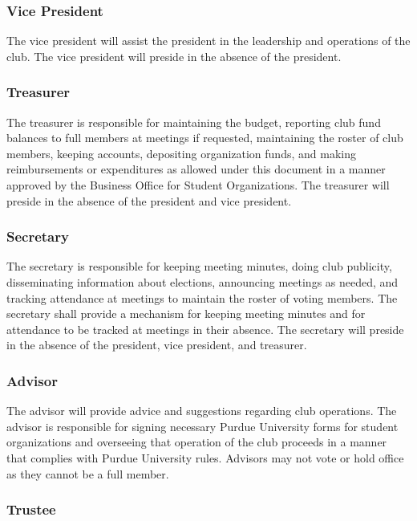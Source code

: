 \documentclass{article}
\begin{document}
\subsubsection{Vice President}

The vice president will assist the president in the leadership and operations of
the club. The vice president will preside in the absence of the president.

\subsubsection{Treasurer}

The treasurer is responsible for maintaining the budget, reporting club fund
balances to full members at meetings if requested, maintaining the roster of
club members, keeping accounts, depositing organization funds, and making
reimbursements or expenditures as allowed under this document in a manner
approved by the Business Office for Student Organizations. The treasurer will
preside in the absence of the president and vice president.

\subsubsection{Secretary}

The secretary is responsible for keeping meeting minutes, doing club publicity,
disseminating information about elections, announcing meetings as needed, and
tracking attendance at meetings to maintain the roster of voting members. The
secretary shall provide a mechanism for keeping meeting minutes and for
attendance to be tracked at meetings in their absence. The secretary will
preside in the absence of the president, vice president, and treasurer.

\subsubsection{Advisor}

The advisor will provide advice and suggestions regarding club operations. The
advisor is responsible for signing necessary Purdue University forms for student
organizations and overseeing that operation of the club proceeds in a manner
that complies with Purdue University rules. Advisors may not vote or hold
office as they cannot be a full member.

\subsubsection{Trustee}
\end{document}
